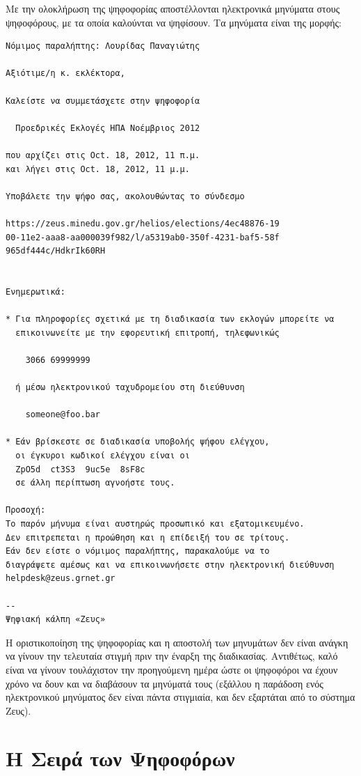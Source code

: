 \documentclass{tufte-handout}
\begin{document}
Με την ολοκλήρωση της ψηφοφορίας αποστέλλονται ηλεκτρονικά μηνύματα
στους ψηφοφόρους, με τα οποία καλούνται να ψηφίσουν. Τα μηνύματα είναι
της μορφής:

\begin{verbatim}
Νόμιμος παραλήπτης: Λουρίδας Παναγιώτης

Αξιότιμε/η κ. εκλέκτορα,

Καλείστε να συμμετάσχετε στην ψηφοφορία

  Προεδρικές Εκλογές ΗΠΑ Νοέμβριος 2012

που αρχίζει στις Oct. 18, 2012, 11 π.μ.
και λήγει στις Oct. 18, 2012, 11 μ.μ.

Υποβάλετε την ψήφο σας, ακολουθώντας το σύνδεσμο

https://zeus.minedu.gov.gr/helios/elections/4ec48876-19
00-11e2-aaa8-aa000039f982/l/a5319ab0-350f-4231-baf5-58f
965df444c/HdkrIk60RH


Ενημερωτικά:

* Για πληροφορίες σχετικά με τη διαδικασία των εκλογών μπορείτε να
  επικοινωνείτε με την εφορευτική επιτροπή, τηλεφωνικώς

    3066 69999999

  ή μέσω ηλεκτρονικού ταχυδρομείου στη διεύθυνση

    someone@foo.bar

* Εάν βρίσκεστε σε διαδικασία υποβολής ψήφου ελέγχου,
  οι έγκυροι κωδικοί ελέγχου είναι οι
  ZpO5d  ct3S3  9uc5e  8sF8c
  σε άλλη περίπτωση αγνοήστε τους.

Προσοχή:
Το παρόν μήνυμα είναι αυστηρώς προσωπικό και εξατομικευμένο.
Δεν επιτρεπεται η προώθηση και η επίδειξή του σε τρίτους.
Εάν δεν είστε ο νόμιμος παραλήπτης, παρακαλούμε να το
διαγράψετε αμέσως και να επικοινωνήσετε στην ηλεκτρονική διεύθυνση
helpdesk@zeus.grnet.gr

--
Ψηφιακή κάλπη «Ζευς»
\end{verbatim}

\noindent Η οριστικοποίηση της ψηφοφορίας και η αποστολή των μηνυμάτων
δεν είναι ανάγκη να γίνουν την τελευταία στιγμή πριν την έναρξη της
διαδικασίας. Αντιθέτως, καλό είναι να γίνουν τουλάχιστον την
προηγούμενη ημέρα ώστε οι ψηφοφόροι να έχουν χρόνο να δουν και να
διαβάσουν τα μηνύματά τους (εξάλλου η παράδοση ενός ηλεκτρονικού
μηνύματος δεν είναι πάντα στιγμιαία, και δεν εξαρτάται από το σύστημα
Ζευς). 

\section{Η Σειρά των Ψηφοφόρων}
\end{document}
